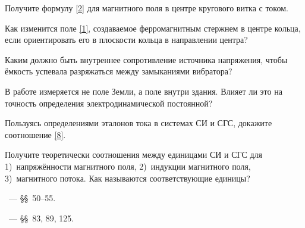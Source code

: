 \begin{lab:questions}
    \item Получите формулу \eqref{2} для магнитного поля в центре
    кругового витка с током.

    \item Как изменится поле \eqref{1}, создаваемое ферромагнитным стержнем
    в центре кольца,
    если ориентировать его в плоскости кольца в направлении центра?

    \item Каким должно быть внутреннее сопротивление источника напряжения, чтобы
ёмкость успевала разряжаться между замыканиями вибратора?

    \item В работе измеряется не поле Земли, а поле внутри здания. Влияет ли это на
точность определения электродинамической постоянной?

    \item Пользуясь определениями эталонов тока в системах СИ и СГС,
    докажите соотношение \eqref{8}.

    \item Получите теоретически соотношения между единицами
    СИ и СГС для 1)~напряжённости магнитного поля,
    2)~индукции магнитного поля, 3)~магнитного потока. Как называются
    соответствующие единицы?
\end{lab:questions}


\begin{lab:literature}
    \item \SivuhinIII~--- \S\S~50--55.

    \item \Kalashnikov~--- \S\S~83, 89, 125.
\end{lab:literature}
